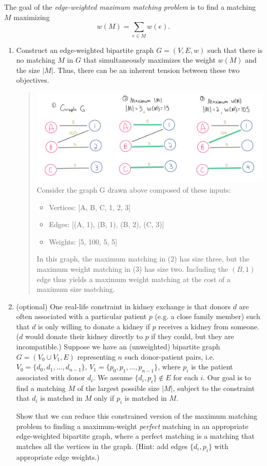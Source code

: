 \documentclass[11pt]{article}
\begin{document}
\begin{enumerate}
   The goal of the {\em edge-weighted maximum matching problem} is to find a matching $M$ maximizing $$w(M) = \sum_{e\in M} w(e).$$
   \begin{enumerate}
    \item Construct an edge-weighted bipartite graph $G = (V,E,w)$ such that there is no matching $M$ in $G$ that simultaneously maximizes the weight $w(M)$ and the size $|M|$.  Thus, there can be an inherent tension between these two objectives. 
   \begin{quote}
    \color{purple}
        \hspace*{-1.25in}
        \includegraphics[scale=0.4]{photos/q4a.png}
        Consider the graph G drawn above composed of these inputs:
        \begin{itemize}
            \item Vertices: [A, B, C, 1, 2, 3]
            \item Edges: [(A, 1), (B, 1), (B, 2), (C, 3)]
            \item Weights: [5, 100, 5, 5]
        \end{itemize}
        In this graph, the maximum matching in (2) has size three, but the maximum weight matching in (3) has size two. Including the $(B, 1)$ edge thus yields a maximum weight matching at the cost of a maximum size matching.
   \end{quote} 

    \item (optional\footnotemark[1])
    One real-life constraint in kidney exchange is that donors $d$ are often associated with a particular patient $p$ (e.g. a close family member) such that $d$ is only willing to donate a kidney if $p$ receives a kidney from someone.  ($d$ would donate their kidney directly to $p$ if they could, but they are incompatible.) 
    Suppose we have an (unweighted) bipartite graph $G=(V_0\cup V_1,E)$ representing $n$ such donor-patient pairs, i.e. $V_0=\{d_0,d_1,\ldots,d_{n-1}\}$, $V_1 = \{p_0,p_1,\ldots,p_{n-1}\}$, where $p_i$ is the patient associated with donor $d_i$. We assume $\{d_i,p_i\}\notin E$ for each $i$.   Our goal is to find a matching $M$ of the largest possible size $|M|$, subject to the constraint that $d_i$ is matched in $M$ only if $p_i$ is matched in $M$. 

    Show that we can reduce this constrained version of the maximum matching problem to finding a maximum-weight {\em perfect} matching in an appropriate edge-weighted bipartite graph, where
    a perfect matching is a matching that matches all the vertices in the graph. (Hint: add edges $\{d_i,p_i\}$ with appropriate edge weights.) 
    \end{enumerate}

\end{enumerate}
\end{document}

